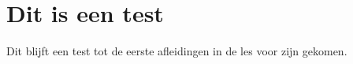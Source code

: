 \documentclass[Documentje]{subfiles}
\begin{document}
\section{Dit is een test}
Dit blijft een test tot de eerste afleidingen in de les voor zijn gekomen.
\end{document}
